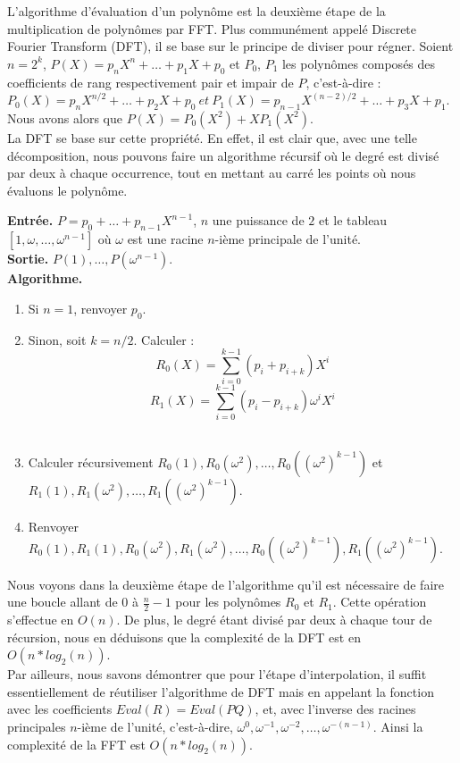 \documentclass[12pt, a4paper]{article}
\begin{document}
L'algorithme d'évaluation d'un polynôme est la deuxième étape de la multiplication de polynômes par FFT. Plus communément appelé Discrete Fourier Transform (DFT), il se base sur le principe de diviser pour régner.
Soient $n = 2^k$, $P(X) = p_n X^n +\dots+p_1 X + p_0$ et $P_0$, $P_1$ les polynômes composés des coefficients de rang respectivement pair et impair de $P$, c'est-à-dire : \\
$P_0(X) = p_{n} X^{n/2} +\dots+ p_2 X + p_0\ et\ P_1(X) = p_{n-1} X^{(n-2)/2} +\dots+ p_3 X + p_1$. \\
Nous avons alors que $P(X) = P_0(X^2)+X P_1(X^2)$. \\
La DFT se base sur cette propriété. En effet, il est clair que, avec une telle décomposition, nous pouvons faire un algorithme récursif où le degré est divisé par deux à chaque occurrence, tout en mettant au carré les points où nous évaluons le polynôme.

\begin{tcolorbox}[colback=cyan!5!white,
                  colframe=cyan!100!black,
                  title=\textbf{Algorithme DFT}
                 ]
\textbf{Entrée.} $P = p_0+\dots+p_{n-1}X^{n-1}$, $n$ une puissance de $2$ et le tableau $[1, \omega,\dots,\omega^{n-1}]$ où $\omega$ est une racine $n$-ième principale de l'unité.\\
\textbf{Sortie.} $P(1),\dots,P(\omega^{n-1})$.\\
\textbf{Algorithme.}
\begin{enumerate}[itemsep=-2ex]
\item\textit{}Si $n=1$, renvoyer $p_0$. \\
\item\textit{}Sinon, soit $k=n/2$. Calculer : \\
\[ R_0(X) = \sum_{i=0}^{k-1}(p_i+p_{i+k})X^i \]
\[ R_1(X) = \sum_{i=0}^{k-1}(p_i-p_{i+k})\omega^iX^i \] \\
\item\textit{}Calculer récursivement $R_0(1), R_0(\omega^2),\dots,R_0((\omega^2)^{k-1})$ et \\ $R_1(1), R_1(\omega^2),\dots,R_1((\omega^2)^{k-1})$. \\
\item\textit{}Renvoyer $R_0(1), R_1(1), R_0(\omega^2), R_1(\omega^2),\dots, R_0((\omega^2)^{k-1}), R_1((\omega^2)^{k-1})$.
\end{enumerate}
\end{tcolorbox}

Nous voyons dans la deuxième étape de l'algorithme qu'il est nécessaire de faire une boucle allant de 0 à $\frac{n}{2}-1$ pour les polynômes $R_0$ et $R_1$. Cette opération s'effectue en $O(n)$. De plus, le degré étant divisé par deux à chaque tour de récursion, nous en déduisons que la complexité de la DFT est en $O(n*log_2(n))$. \\
\indent Par ailleurs, nous savons démontrer que pour l'étape d'interpolation, il suffit essentiellement de réutiliser l'algorithme de DFT mais en appelant la fonction avec les coefficients $Eval(R)=Eval(PQ)$, et, avec l'inverse des racines principales $n$-ième de l'unité, c'est-à-dire, $\omega^{0},\omega^{-1},\omega^{-2},\dots,\omega^{-(n-1)}$.
Ainsi la complexité de la FFT est $O(n*log_2(n))$.
\end{document}
